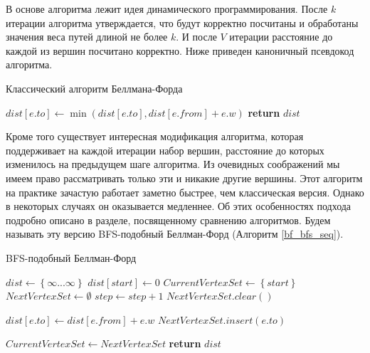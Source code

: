 В основе алгоритма лежит идея динамического программирования. После $k$ итерации алгоритма утверждается, что будут корректно посчитаны и обработаны значения веса путей длиной не более $k$. И после $V$ итерации расстояние до каждой из вершин посчитано корректно. Ниже приведен каноничный псевдокод алгоритма. 

\FloatBarrier
\begin{algorithm}
\caption{Классический алгоритм Беллмана-Форда}\label{bf_classic_seq}
\begin{algorithmic}[1]
 
		\State $dist[e.to] \gets \min(dist[e.to], dist[e.from] + e.w)$
	\EndFor
\EndFor
\State \textbf{return} $dist$
\EndProcedure
\end{algorithmic}
\end{algorithm}

\FloatBarrier
Кроме того существует интересная модификация алгоритма, которая поддерживает на каждой итерации набор вершин, расстояние до которых изменилось на предыдущем шаге алгоритма. Из очевидных соображений мы имеем право рассматривать только эти и никакие другие вершины. Этот алгоритм на практике зачастую работает заметно быстрее, чем классическая версия. Однако в некоторых случаях он оказывается медленнее. Об этих особенностях подхода подробно описано в разделе, посвященному сравнению алгоритмов. Будем называть эту версию BFS-подобный Беллман-Форд (Алгоритм \ref{bf_bfs_seq}). 

\FloatBarrier
\begin{algorithm}
\caption{BFS-подобный Беллман-Форд}\label{bf_bfs_seq}
\begin{algorithmic}[1]
\State $dist\gets \left\{ {\infty ... \infty}\right\}$
\State $dist[start] \gets 0$
\State $CurrentVertexSet \gets \left\{ {start}\right\}$ 
\State $NextVertexSet \gets \emptyset$ 
	\State $step \gets step + 1$
	\State $NextVertexSet.clear()$
	
		  
				\State $dist[e.to] \gets dist[e.from] + e.w$
				\State $NextVertexSet.insert(e.to)$								
			\EndIf
		\EndFor
	\EndFor
	
	\State $CurrentVertexSet \gets NextVertexSet$	
\EndWhile
\State \textbf{return} $dist$

\EndProcedure
\end{algorithmic}
\end{algorithm}

